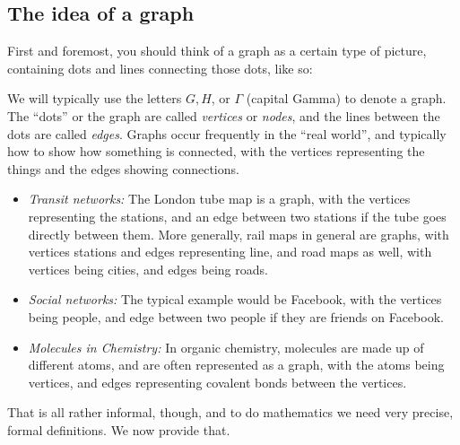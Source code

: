 \documentclass[10pt,]{book}
\theoremstyle{plain}
\theoremstyle{definition}
\theoremstyle{definition}
\theoremstyle{definition}
\theoremstyle{definition}
\numberwithin{equation}{section}
\begin{document}
\subsection[{The idea of a graph}]{The idea of a graph}\label{subsection-1}
\hypertarget{p-2}{}%
First and foremost, you should think of a graph as a certain type of picture, containing dots and lines connecting those dots, like so:%
\par
\hypertarget{p-3}{}%
We will typically use the letters \(G, H\), or \(\Gamma\) (capital Gamma) to denote a graph.  The ``dots'' or the graph are called \emph{vertices} or \emph{nodes}, and the lines between the dots are called \emph{edges}. Graphs occur frequently in the ``real world'', and typically how to show how something is connected, with the vertices representing the things and the edges showing connections.  \leavevmode%
\begin{itemize}[label=\textbullet]
\item{}\emph{Transit networks:} The London tube map is a graph, with the vertices representing the stations, and an edge between two stations if the tube goes directly between them.  More generally, rail maps in general are graphs, with vertices stations and edges representing line, and road maps as well, with vertices being cities, and edges being roads.%
\item{}\emph{Social networks:} The typical example would be Facebook, with the vertices being people, and edge between two people if they are friends on Facebook.%
\item{}\emph{Molecules in Chemistry:} In organic chemistry, molecules are made up of different atoms, and are often represented as a graph, with the atoms being vertices, and edges representing covalent bonds between the vertices.%
\end{itemize}
%
\par
\hypertarget{p-4}{}%
That is all rather informal, though, and to do mathematics we need very precise, formal definitions.  We now provide that.%
\typeout{************************************************}
\typeout{************************************************}
\end{document}
